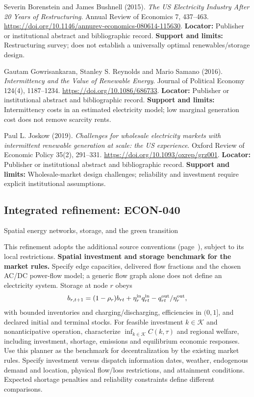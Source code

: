 \documentclass[11pt,a4paper]{article}
\begin{document}
\begin{enumerate}[label={[\textnormal{S}\arabic*]},leftmargin=*]

\item Severin Borenstein and James Bushnell (2015). \emph{The US Electricity Industry After 20 Years of Restructuring}. Annual Review of Economics 7, 437–463. \url{https://doi.org/10.1146/annurev-economics-080614-115630}. \textbf{Locator:} Publisher or institutional abstract and bibliographic record. \textbf{Support and limits:} Restructuring survey; does not establish a universally optimal renewables/storage design.

\item Gautam Gowrisankaran, Stanley S. Reynolds and Mario Samano (2016). \emph{Intermittency and the Value of Renewable Energy}. Journal of Political Economy 124(4), 1187–1234. \url{https://doi.org/10.1086/686733}. \textbf{Locator:} Publisher or institutional abstract and bibliographic record. \textbf{Support and limits:} Intermittency costs in an estimated electricity model; low marginal generation cost does not remove scarcity rents.

\item Paul L. Joskow (2019). \emph{Challenges for wholesale electricity markets with intermittent renewable generation at scale: the US experience}. Oxford Review of Economic Policy 35(2), 291–331. \url{https://doi.org/10.1093/oxrep/grz001}. \textbf{Locator:} Publisher or institutional abstract and bibliographic record. \textbf{Support and limits:} Wholesale-market design challenges; reliability and investment require explicit institutional assumptions.

\end{enumerate}

\subsection*{Integrated refinement: ECON-040}
{\sffamily\small\color{muted}Spatial energy networks, storage, and the green transition\par}
This refinement adopts the additional source conventions
(page~\pageref{audited:conventions}), subject to its local restrictions.
\textbf{Spatial investment and storage benchmark for the market rules.}
Specify edge capacities, delivered flow fractions and the chosen AC/DC
power-flow model; a generic flow graph alone does not define an electricity
system. Storage at node $r$ obeys
\[
b_{r,t+1}=(1-\rho_r)b_{rt}+\eta_r^{\rm in}q_{rt}^{\rm in}
                              -q_{rt}^{\rm out}/\eta_r^{\rm out},
\]
with bounded inventories and charging/discharging, efficiencies in $(0,1]$,
and declared initial and terminal stocks. For feasible investment
$k\in\mathcal K$ and nonanticipative operation, characterize
$\inf_{k\in\mathcal K}C(k,\tau)$ and regional welfare, including investment,
shortage, emissions and equilibrium economic responses. Use this planner as the
benchmark for decentralization by the existing market rules. Specify investment
versus dispatch information dates, weather, endogenous demand and location,
physical flow/loss restrictions, and attainment conditions. Expected shortage
penalties and reliability constraints define different comparisons.
\end{document}
